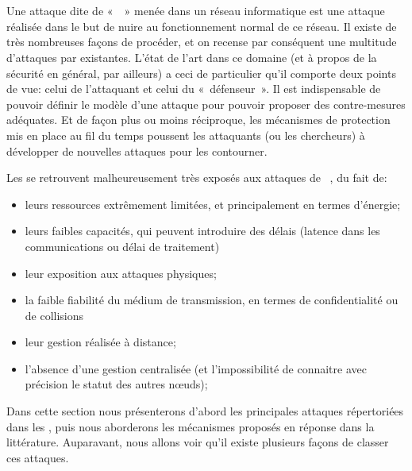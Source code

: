 \section{\Dds}\label{ea:sec:dos}

Une attaque dite de « \dds » menée dans un réseau informatique est une attaque réalisée dans le but de nuire au fonctionnement normal de ce réseau.
Il existe de très nombreuses façons de procéder, et on recense par conséquent une multitude d'attaques par \dds existantes.
L'état de l'art dans ce domaine (et à propos de la sécurité en général, par ailleurs) a ceci de particulier qu'il comporte deux points de vue: celui de l'attaquant et celui du « défenseur ».
Il est indispensable de pouvoir définir le modèle d'une attaque pour pouvoir proposer des contre-mesures adéquates.
Et de façon plus ou moins réciproque, les mécanismes de protection mis en place au fil du temps poussent les attaquants (ou les chercheurs) à développer de nouvelles attaques pour les contourner.

Les \rcs se retrouvent malheureusement très exposés aux attaques de \dds~\cite{RM11}, du fait de:
\begin{itemize}
    \item leurs ressources extrêmement limitées, et principalement en termes d'énergie;
    \item leurs faibles capacités, qui peuvent introduire des délais (latence dans les communications ou délai de traitement)
    \item leur exposition aux attaques physiques;
    \item la faible fiabilité du médium de transmission, en termes de confidentialité ou de collisions
    \item leur gestion réalisée à distance;
    \item l'absence d'une gestion centralisée (et l'impossibilité de connaitre avec précision le statut des autres nœuds);
\end{itemize}

Dans cette section nous présenterons d'abord les principales attaques répertoriées dans les \rcs, puis nous aborderons les mécanismes proposés en réponse dans la littérature.
Auparavant, nous allons voir qu'il existe plusieurs façons de classer ces attaques.










